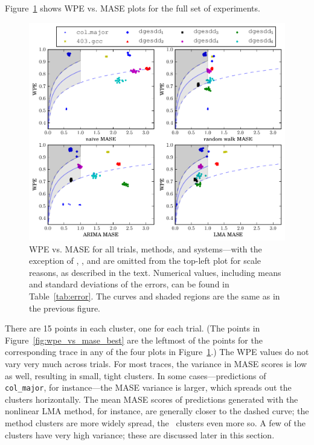 Figure~\ref{fig:wpe_vs_mase_all} shows WPE vs. MASE plots for the full
set of experiments.
\begin{figure}
  \centering
  \includegraphics[width=1.7\columnwidth]{figs/new_predictions_vs_entropy4a}
\caption{WPE vs. MASE for all trials, methods, and systems---with the
  exception of \svdone, \svdthree, and \svdfive are omitted from the
  top-left plot for scale reasons, as described in the text.
%
%
Numerical values, including means and standard deviations of the
errors, can be found in Table~\ref{tab:error}.  The curves and shaded
regions are the same as in the previous figure.  }
    \label{fig:wpe_vs_mase_all}
\end{figure}
There are 15 points in each cluster, one for each trial.  (The points
in Figure~\ref{fig:wpe_vs_mase_best} are the leftmost of the points
for the corresponding trace in any of the four plots in
Figure~\ref{fig:wpe_vs_mase_all}.)  The WPE values do not vary very
much across trials.  For most traces, the variance in MASE scores is
low as well, resulting in small, tight clusters.  In some
cases---\arima predictions of {\tt col\_major}, for instance---the
MASE variance is larger, which spreads out the clusters horizontally.
The mean MASE scores of predictions generated with the nonlinear LMA
method, for instance, are generally closer to the dashed curve; the
\arima method clusters are more widely spread, the \naive ~clusters
even more so.  A few of the clusters have very high variance; these
are discussed later in this section.

